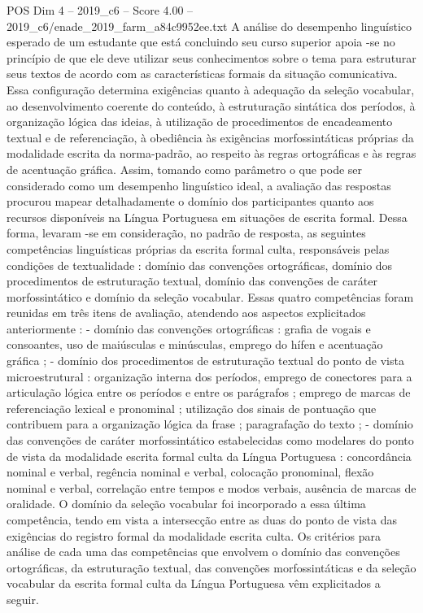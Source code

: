 \begin{textsample}{POS Dim 4 – 2019\_c6 – Score 4.00 – 2019\_c6/enade\_2019\_farm\_a84c9952ee.txt}
A análise do desempenho linguístico esperado de um estudante que está concluindo seu curso superior apoia -se no princípio de que ele deve utilizar seus conhecimentos sobre o tema para estruturar seus textos de acordo com as características formais da situação comunicativa.
Essa configuração determina exigências quanto à adequação da seleção vocabular, ao desenvolvimento coerente do conteúdo, à estruturação sintática dos períodos, à organização lógica das ideias, à utilização de procedimentos de encadeamento textual e de referenciação, à obediência às exigências morfossintáticas próprias da modalidade escrita da norma-padrão, ao respeito às regras ortográficas e às regras de acentuação gráfica.
Assim, tomando como parâmetro o que pode ser considerado como um desempenho linguístico ideal, a avaliação das respostas procurou mapear detalhadamente o domínio dos participantes quanto aos recursos disponíveis na Língua Portuguesa em situações de escrita formal.
Dessa forma, levaram -se em consideração, no padrão de resposta, as seguintes competências linguísticas próprias da escrita formal culta, responsáveis pelas condições de textualidade : domínio das convenções ortográficas, domínio dos procedimentos de estruturação textual, domínio das convenções de caráter morfossintático e domínio da seleção vocabular.
Essas quatro competências foram reunidas em três itens de avaliação, atendendo aos aspectos explicitados anteriormente : - domínio das convenções ortográficas : grafia de vogais e consoantes, uso de maiúsculas e minúsculas, emprego do hífen e acentuação gráfica ; - domínio dos procedimentos de estruturação textual do ponto de vista microestrutural : organização interna dos períodos, emprego de conectores para a articulação lógica entre os períodos e entre os parágrafos ; emprego de marcas de referenciação lexical e pronominal ; utilização dos sinais de pontuação que contribuem para a organização lógica da frase ; paragrafação do texto ; - domínio das convenções de caráter morfossintático estabelecidas como modelares do ponto de vista da modalidade escrita formal culta da Língua Portuguesa : concordância nominal e verbal, regência nominal e verbal, colocação pronominal, flexão nominal e verbal, correlação entre tempos e modos verbais, ausência de marcas de oralidade.
O domínio da seleção vocabular foi incorporado a essa última competência, tendo em vista a intersecção entre as duas do ponto de vista das exigências do registro formal da modalidade escrita culta.
Os critérios para análise de cada uma das competências que envolvem o domínio das convenções ortográficas, da estruturação textual, das convenções morfossintáticas e da seleção vocabular da escrita formal culta da Língua Portuguesa vêm explicitados a seguir.

\end{textsample}
